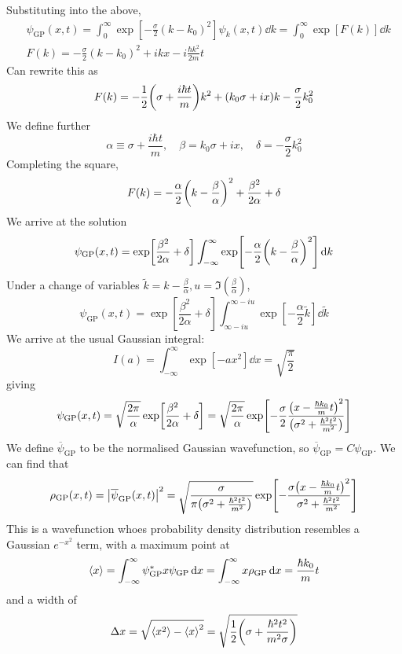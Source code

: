 \documentclass[a4paper,11pt]{article}
\begin{document}
Substituting into the above,
\begin{align*}
    &\psi_{\text{GP}}(x,t) = \int_0^\infty \exp[-\frac{\sigma}{2}(k-k_0)^2] \psi_k(x,t) \dd{k} = \int_0^\infty \exp[F(k)] \dd{k}\\ 
    & F(k) = -\frac{\sigma}{2}(k-k_0)^2 + ikx - i \frac{\hbar k^2}{2m} t
\end{align*}
Can rewrite this as
\[
	F(k) = -\frac{1}{2}\qty(\sigma + \frac{i \hbar t}{m}) k^2 + (k_0 \sigma + ix)k - \frac{\sigma}{2} k_0^2
\]
We define further
\[
	\alpha \equiv \sigma + \frac{i \hbar t}{m},\quad \beta = k_0 \sigma + ix,\quad \delta = -\frac{\sigma}{2} k_0^2
\]
Completing the square,
\[
	F(k) = -\frac{\alpha}{2} \qty(k - \frac{\beta}{\alpha})^2 + \frac{\beta^2}{2\alpha} + \delta
\]
We arrive at the solution
\[
	\psi_{\text{GP}}(x,t) = \exp[\frac{\beta^2}{2\alpha} + \delta] \int_{-\infty}^\infty \exp[-\frac{\alpha}{2}\qty(k - \frac{\beta}{\alpha})^2 ] \dd{k}
\]
Under a change of variables \( \widetilde k = k - \frac{\beta}{\alpha}, u = \Im(\frac{\beta}{\alpha}) \),
\[
	\psi_{\text{GP}}(x,t) = \exp[\frac{\beta^2}{2\alpha} + \delta] \int_{\infty - iu}^{\infty - iu} \exp[-\frac{\alpha}{2} \widetilde k] \dd{\widetilde k}
\]
We arrive at the usual Gaussian integral:
\[
	I(a) = \int_{-\infty}^\infty \exp[-a x^2] \dd{x} = \sqrt{\frac{\pi}{2}}
\]
giving
\[
	\psi_{\text{GP}}(x,t) = \sqrt{\frac{2 \pi}{\alpha}} \exp[\frac{\beta^2}{2\alpha} + \delta] = \sqrt{\frac{2\pi}{\alpha}} \exp[-\frac{\sigma}{2} \frac{\qty(x - \frac{\hbar k_0}{m} t)^2}{\qty(\sigma^2 + \frac{\hbar^2 t^2}{m^2} )} ]
\]
We define \( \overline \psi_{\text{GP}} \) to be the normalised Gaussian wavefunction, so \( \overline \psi_{\text{GP}} = C \psi_{\text{GP}} \).
We can find that
\[
	\rho_{\text{GP}}(x,t) = \abs{\overline \psi_{\text{GP}}(x,t)}^2 = \sqrt{\frac{\sigma}{\pi \qty(\sigma^2 + \frac{\hbar^2 t^2}{m^2})}} \exp[ - \frac{\sigma\qty(x - \frac{\hbar k_0}{m} t)^2}{\sigma^2 + \frac{\hbar^2 t^2}{m^2}} ]
\]
This is a wavefunction whoes probability density distribution resembles a Gaussian \( e^{-x^2} \) term, with a maximum point at
\[
	\left\langle{x}\right\rangle = \int_{-\infty}^\infty \psi_{\text{GP}}^* x \psi_{\text{GP}} \dd{x} = \int_{-\infty}^\infty x \rho_{\text{GP}} \dd{x} = \frac{\hbar k_0}{m} t
\]
and a width of
\[
	\Delta x = \sqrt{\left\langle{x^2}\right\rangle - \left\langle{x}\right\rangle^2} = \sqrt{\frac{1}{2} \qty(\sigma + \frac{\hbar^2 t^2}{m^2 \sigma})}
\]
\end{document}
